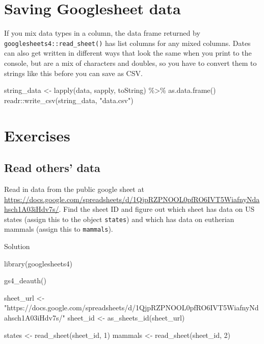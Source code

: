 \documentclass[
]{book}
\newenvironment{Shaded}{\begin{snugshade}}{\end{snugshade}}
\newcommand{\DecValTok}[1]{\textcolor[rgb]{0.00,0.00,0.81}{#1}}
\newcommand{\FunctionTok}[1]{\textcolor[rgb]{0.00,0.00,0.00}{#1}}
\newcommand{\NormalTok}[1]{#1}
\newcommand{\OtherTok}[1]{\textcolor[rgb]{0.56,0.35,0.01}{#1}}
\newcommand{\SpecialCharTok}[1]{\textcolor[rgb]{0.00,0.00,0.00}{#1}}
\newcommand{\StringTok}[1]{\textcolor[rgb]{0.31,0.60,0.02}{#1}}
\begin{document}
\hypertarget{gs4_save}{%
\section{Saving Googlesheet data}\label{gs4_save}}

If you mix data types in a column, the data frame returned by \texttt{googlesheets4::read\_sheet()} has list columns for any mixed columns. Dates can also get written in different ways that look the same when you print to the console, but are a mix of characters and doubles, so you have to convert them to strings like this before you can save as CSV.

\begin{Shaded}
\begin{Highlighting}[]
\NormalTok{string\_data }\OtherTok{\textless{}{-}} \FunctionTok{lapply}\NormalTok{(data, sapply, toString) }\SpecialCharTok{\%\textgreater{}\%} \FunctionTok{as.data.frame}\NormalTok{()}
\NormalTok{readr}\SpecialCharTok{::}\FunctionTok{write\_csv}\NormalTok{(string\_data, }\StringTok{"data.csv"}\NormalTok{)}
\end{Highlighting}
\end{Shaded}

\hypertarget{exercises-data}{%
\section{Exercises}\label{exercises-data}}

\hypertarget{read-others-data}{%
\subsection{Read others' data}\label{read-others-data}}

Read in data from the public google sheet at \url{https://docs.google.com/spreadsheets/d/1QjpRZPNOOL0pfRO6IVT5WiafnyNdahsch1A03iHdv7s/}. Find the sheet ID and figure out which sheet has data on US states (assign this to the object \texttt{states}) and which has data on eutherian mammals (assign this to \texttt{mammals}).

Solution

\begin{Shaded}
\begin{Highlighting}[]
\FunctionTok{library}\NormalTok{(googlesheets4)}

\FunctionTok{gs4\_deauth}\NormalTok{()}

\NormalTok{sheet\_url }\OtherTok{\textless{}{-}} \StringTok{"https://docs.google.com/spreadsheets/d/1QjpRZPNOOL0pfRO6IVT5WiafnyNdahsch1A03iHdv7s/"}
\NormalTok{sheet\_id }\OtherTok{\textless{}{-}} \FunctionTok{as\_sheets\_id}\NormalTok{(sheet\_url)}

\NormalTok{states }\OtherTok{\textless{}{-}} \FunctionTok{read\_sheet}\NormalTok{(sheet\_id, }\DecValTok{1}\NormalTok{)}
\NormalTok{mammals }\OtherTok{\textless{}{-}} \FunctionTok{read\_sheet}\NormalTok{(sheet\_id, }\DecValTok{2}\NormalTok{)}
\end{Highlighting}
\end{Shaded}
\end{document}
